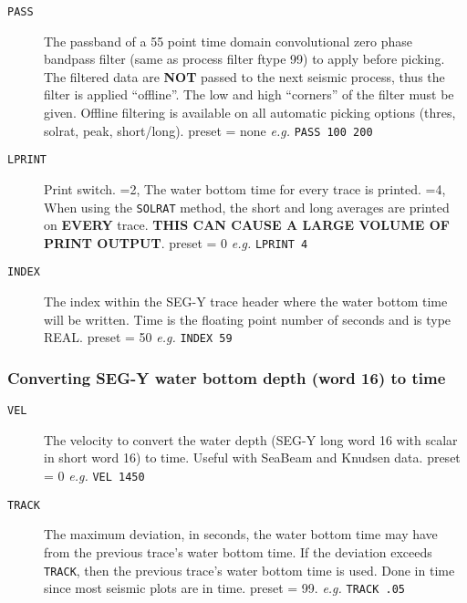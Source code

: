 \begin{description}
\item[\texttt{PASS}] The passband of a 55 point time domain convolutional zero phase
         bandpass filter (same as process filter ftype 99) to apply
         before picking.  The filtered data are \textbf{NOT} passed to the next
         seismic process, thus the filter is applied ``offline''.  The
         low and high ``corners'' of the filter must be given.  Offline
         filtering is available on all automatic picking options (thres,
         solrat, peak, short/long).
         \Gls{preset} = none      \textit{e.g.}  \texttt{PASS 100 200}

\item[\texttt{LPRINT}] Print switch.
       =2, The water bottom time for every trace is printed.
       =4, When using the \texttt{SOLRAT} method, the short and long averages
         are printed on \textbf{EVERY} trace.  \textbf{THIS CAN CAUSE A LARGE VOLUME
         OF PRINT OUTPUT}.
         \Gls{preset} = 0     \textit{e.g.}   \texttt{LPRINT 4}

\item[\texttt{INDEX}] The index within the SEG-Y trace header where the water
         bottom time will be written.  Time is the floating point
         number of seconds and is type REAL.
         \Gls{preset} = 50    \textit{e.g.}     \texttt{INDEX 59}
\end{description}

\subsubsection{Converting SEG-Y water bottom depth (word 16) to time}

\begin{description}
\item[\texttt{VEL}] The velocity to convert the water depth (SEG-Y long word 16
         with scalar in short word 16) to time.  Useful with SeaBeam
         and Knudsen data.
         \Gls{preset} = 0     \textit{e.g.}   \texttt{VEL 1450}

\item[\texttt{TRACK}] The maximum deviation, in seconds, the water bottom time
         may have from the previous trace's water bottom time.  If the
         deviation exceeds \texttt{TRACK}, then the previous trace's water
         bottom time is used.  Done in time since most seismic plots
         are in time.
         \Gls{preset} = 99.    \textit{e.g.}  \texttt{TRACK .05}
\end{description}

